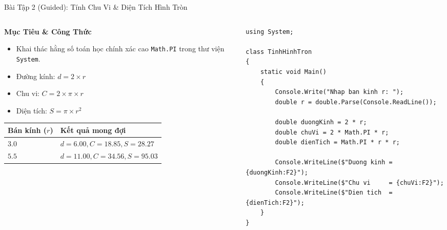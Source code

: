 \documentclass[aspectratio=169, 10pt]{beamer}
\begin{document}
\begin{frame}[fragile]{Bài Tập 2 (Guided): Tính Chu Vi \& Diện Tích Hình Tròn}
  \begin{columns}[T]
    \begin{column}{0.45\textwidth}
      \begin{block}{\textbf{Mục Tiêu \& Công Thức}}
        \begin{itemize}
          \item Khai thác hằng số toán học chính xác cao \texttt{Math.PI} trong thư viện \texttt{System}.
          \item Đường kính: $d = 2 \times r$
          \item Chu vi: $C = 2 \times \pi \times r$
          \item Diện tích: $S = \pi \times r^2$
        \end{itemize}
      \end{block}
      \begin{table}[h]
        \centering
        \scriptsize
        \begin{tabularx}{\textwidth}{XX}
          \toprule
          \textbf{Bán kính ($r$)} & \textbf{Kết quả mong đợi} \\
          \midrule
          $3.0$ & $d = 6.00, C = 18.85, S = 28.27$ \\
          $5.5$ & $d = 11.00, C = 34.56, S = 95.03$ \\
          \bottomrule
        \end{tabularx}
      \end{table}
    \end{column}
    \begin{column}{0.53\textwidth}
\begin{lstlisting}
using System;

class TinhHinhTron
{
    static void Main()
    {
        Console.Write("Nhap ban kinh r: ");
        double r = double.Parse(Console.ReadLine());

        double duongKinh = 2 * r;
        double chuVi = 2 * Math.PI * r;
        double dienTich = Math.PI * r * r;

        Console.WriteLine($"Duong kinh = {duongKinh:F2}");
        Console.WriteLine($"Chu vi     = {chuVi:F2}");
        Console.WriteLine($"Dien tich  = {dienTich:F2}");
    }
}
\end{lstlisting}
    \end{column}
  \end{columns}
\end{frame}
\end{document}
